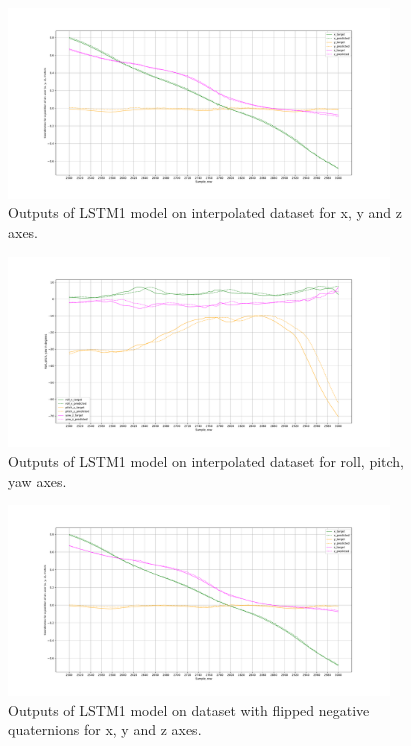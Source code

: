 
\begin{figure}
	\begin{center}
		\includegraphics[width=0.9\textwidth, keepaspectratio]{gfx/lstm1_interpolated-xyz_position.pdf}
		\caption{\label{fig:interp1} Outputs of LSTM1 model on interpolated dataset for x, y and z axes.}
	\end{center}
\end{figure}

\begin{figure}
	\begin{center}
		\includegraphics[width=0.9\textwidth, keepaspectratio]{gfx/lstm1_interpolated-roll_pitch_yaw.pdf}
		\caption{\label{fig:interp2} Outputs of LSTM1 model on interpolated dataset for roll, pitch, yaw axes.}
	\end{center}
\end{figure}

\begin{figure}
	\begin{center}
		\includegraphics[width=0.9\textwidth, keepaspectratio]{gfx/lstm1_flipped-xyz_position.pdf}
		\caption{\label{fig:flip1} Outputs of LSTM1 model on dataset with flipped negative quaternions for x, y and z axes.}
	\end{center}
\end{figure}


